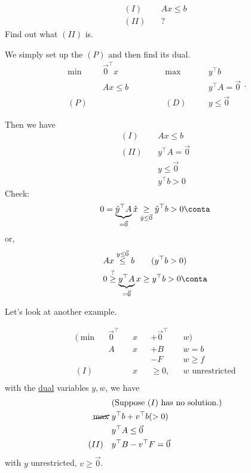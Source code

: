 \begin{eg}
	\[
		\begin{aligned}
			(I)\quad  & Ax\leq b \\
			(II)\quad & ?
		\end{aligned}
	\]
	Find out what \((II)\) is.
\end{eg}
\begin{explanation}
	We simply set up the \((P)\) and then find its dual.
	\[
		\begin{alignedat}{5}
			\min~&\vec{0}^{\top} x\qquad\qquad	&&\max ~&&y^{\top}b\\
			&Ax \leq b 			&&			&&y^{\top} A =\vec{0}\\
			(P)\quad&			&&(D)\quad	&&y\leq \vec{0}
		\end{alignedat}.
	\]

	Then we have
	\[
		\begin{aligned}
			(I)\quad  & Ax\leq b            \\
			(II)\quad & y^{\top}A = \vec{0} \\
			          & y\leq \vec{0}       \\
			          & y^{\top} b>0
		\end{aligned}
	\]
	Check\(\colon\)
	\[
		0 = \underbrace{\hat{y}^{\top} A}_{=\vec{0}} \hat{x} \underset{\hat{y} \leq \vec{0}}{\geq}  \hat{y}^{\top} b>0 \conta
	\]
	or,
	\[
		\begin{split}
			&Ax \overset{y\leq \vec{0}}{\leq} b\qquad (y^{\top}b>0)\\
			&0 \overset{?}{\geq} \underbrace{y^{\top}A}_{ = \vec{0}} x\geq y^{\top}b>0\conta
		\end{split}
	\]
\end{explanation}

Let's look at another example.

\begin{eg}
	\[
		\begin{alignedat}{4}
			(\min~   & \vec{0}^{\top} &&x &&+ \vec{0}^{\top} &&w)            \\
			& A&&x &&+ B&&w = b    \\
			& && &&-F&&w \geq f \\
			(I)\quad & &&x&&\geq  0, &&w\text{ unrestricted}          \\
		\end{alignedat}
	\]
	with the \hyperref[def:dual]{dual} variables \(y, w\), we have
	\[
		\begin{aligned}
			               & (\text{Suppose \((I)\) has no solution.}) \\
			\cancel{\max}~ & y^{\top} b + v^{\top} b (>0)              \\
			               & y^{\top} A \leq \vec{0}                   \\
			(II)\quad      & y^{\top} B - v^{\top} F = \vec{0}
		\end{aligned}
	\]
	with \(y\) unrestricted, \(v\geq  \vec{0}\).
\end{eg}

